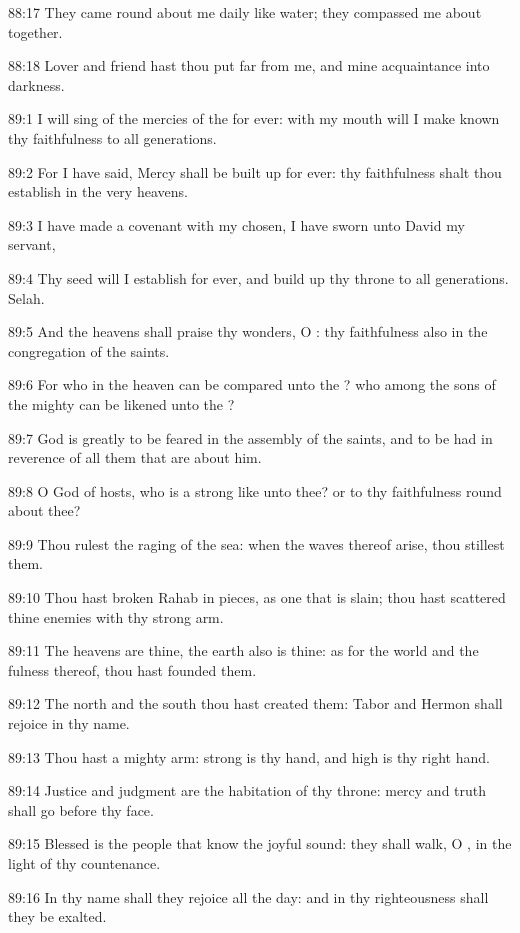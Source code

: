 88:17 They came round about me daily like water; they compassed me
about together.

88:18 Lover and friend hast thou put far from me, and mine
acquaintance into darkness.



89:1 I will sing of the mercies of the \LORD for ever: with my mouth
will I make known thy faithfulness to all generations.

89:2 For I have said, Mercy shall be built up for ever: thy
faithfulness shalt thou establish in the very heavens.

89:3 I have made a covenant with my chosen, I have sworn unto David my
servant,

89:4 Thy seed will I establish for ever, and build up thy throne to
all generations. Selah.

89:5 And the heavens shall praise thy wonders, O \LORD: thy
faithfulness also in the congregation of the saints.

89:6 For who in the heaven can be compared unto the \LORD? who among
the sons of the mighty can be likened unto the \LORD?

89:7 God is greatly to be feared in the assembly of the saints, and to
be had in reverence of all them that are about him.

89:8 O \LORD God of hosts, who is a strong \LORD like unto thee? or to
thy faithfulness round about thee?

89:9 Thou rulest the raging of the sea: when the waves thereof arise,
thou stillest them.

89:10 Thou hast broken Rahab in pieces, as one that is slain; thou
hast scattered thine enemies with thy strong arm.

89:11 The heavens are thine, the earth also is thine: as for the world
and the fulness thereof, thou hast founded them.

89:12 The north and the south thou hast created them: Tabor and Hermon
shall rejoice in thy name.

89:13 Thou hast a mighty arm: strong is thy hand, and high is thy
right hand.

89:14 Justice and judgment are the habitation of thy throne: mercy and
truth shall go before thy face.

89:15 Blessed is the people that know the joyful sound: they shall
walk, O \LORD, in the light of thy countenance.

89:16 In thy name shall they rejoice all the day: and in thy
righteousness shall they be exalted.

